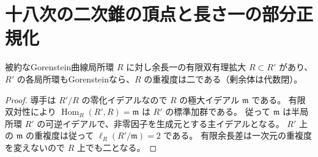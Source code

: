 \section{十八次の二次錐の頂点と長さ一の部分正規化}
\label{sec:cofactor-eighteen-cone-inverse}
\begin{lemma}\label{lem:cofactor-colength-one-multiplicity}
被約なGorenstein曲線局所環 $R$ に対し余長一の有限双有理拡大 $R\subset R'$ があり、
$R'$ の各局所環もGorensteinなら、$R$ の重複度は二である（剰余体は代数閉）。
\end{lemma}
\begin{proof}
導手は $R'/R$ の零化イデアルなので $R$ の極大イデアル $\mathfrak m$ である。
有限双対性により $\operatorname{Hom}_R(R',R)=\mathfrak m$ は $R'$ の標準加群である。
従って $\mathfrak m$ は半局所環 $R'$ の可逆イデアルで、非零因子を生成元とする主イデアルとなる。
$R'$ 上の $\mathfrak m$ の重複度は従って $\ell_R(R'/\mathfrak m)=2$ である。
有限余長差は一次元の重複度を変えないので $R$ 上でも二となる。
\end{proof}

